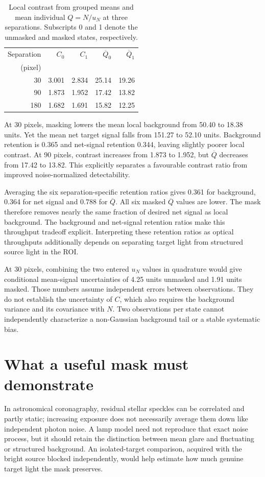 \begin{table}[t]
\caption{Local contrast from grouped means and mean individual $Q=N/u_N$ at three separations. Subscripts 0 and 1 denote the unmasked and masked states, respectively.}
\label{tab:coronagraph-contrast-results}
\centering\footnotesize
\begin{tabular}{@{}rrrrr@{}}
\toprule
Separation&$C_0$&$C_1$&$\overline Q_0$&$\overline Q_1$\\
(pixel)&&&&\\
\midrule
30&3.001&2.834&25.14&19.26\\
90&1.873&1.952&17.42&13.82\\
180&1.682&1.691&15.82&12.25\\
\bottomrule
\end{tabular}
\end{table}

At 30 pixels, masking lowers the mean local background from 50.40 to 18.38 units. Yet the mean net target signal falls from 151.27 to 52.10 units. Background retention is 0.365 and net-signal retention 0.344, leaving slightly poorer local contrast. At 90 pixels, contrast increases from 1.873 to 1.952, but $\overline Q$ decreases from 17.42 to 13.82. This explicitly separates a favourable contrast ratio from improved noise-normalized detectability.

Averaging the six separation-specific retention ratios gives 0.361 for background, 0.364 for net signal and 0.788 for $\overline Q$. All six masked $\overline Q$ values are lower. The mask therefore removes nearly the same fraction of desired net signal as local background. The background and net-signal retention ratios make this throughput tradeoff explicit. Interpreting these retention ratios as optical throughputs additionally depends on separating target light from structured source light in the ROI.

At 30 pixels, combining the two entered $u_N$ values in quadrature would give conditional mean-signal uncertainties of 4.25 units unmasked and 1.91 units masked. Those numbers assume independent errors between observations. They do not establish the uncertainty of $C$, which also requires the background variance and its covariance with $N$. Two observations per state cannot independently characterize a non-Gaussian background tail or a stable systematic bias.

\section{What a useful mask must demonstrate}
In astronomical coronagraphy, residual stellar speckles can be correlated and partly static; increasing exposure does not necessarily average them down like independent photon noise\cite{soummer2007}. A lamp model need not reproduce that exact noise process, but it should retain the distinction between mean glare and fluctuating or structured background. An isolated-target comparison, acquired with the bright source blocked independently, would help estimate how much genuine target light the mask preserves.

